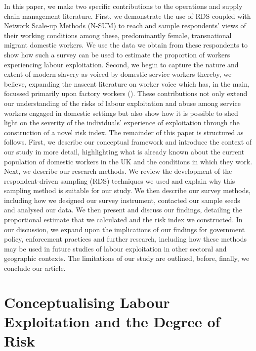 \documentclass[
  12pt,
  letterpaper,
  DIV=11,
  numbers=noendperiod]{scrartcl}
\begin{document}
In this paper, we make two specific contributions to the operations and
supply chain management literature. First, we demonstrate the use of RDS
coupled with Network Scale-up Methods (N-SUM) to reach and sample
respondents' views of their working conditions among these,
predominantly female, transnational migrant domestic workers. We use the
data we obtain from these respondents to show how such a survey can be
used to estimate the proportion of workers experiencing labour
exploitation. Second, we begin to capture the nature and extent of
modern slavery as voiced by domestic service workers thereby, we
believe, expanding the nascent literature on worker voice which has, in
the main, focussed primarily upon factory workers
(\textcite{stephens_theorising_2024}). These contributions not only
extend our understanding of the risks of labour exploitation and abuse
among service workers engaged in domestic settings but also show how it
is possible to shed light on the severity of the individuals' experience
of exploitation through the construction of a novel risk index. The
remainder of this paper is structured as follows. First, we describe our
conceptual framework and introduce the context of our study in more
detail, highlighting what is already known about the current population
of domestic workers in the UK and the conditions in which they work.
Next, we describe our research methods. We review the development of the
respondent-driven sampling (RDS) techniques we used and explain why this
sampling method is suitable for our study. We then describe our survey
methods, including how we designed our survey instrument, contacted our
sample seeds and analysed our data. We then present and discuss our
findings, detailing the proportional estimate that we calculated and the
risk index we constructed. In our discussion, we expand upon the
implications of our findings for government policy, enforcement
practices and further research, including how these methods may be used
in future studies of labour exploitation in other sectoral and
geographic contexts. The limitations of our study are outlined, before,
finally, we conclude our article.

\section{Conceptualising Labour Exploitation and the Degree of
Risk}\label{conceptualising-labour-exploitation-and-the-degree-of-risk}
\end{document}
